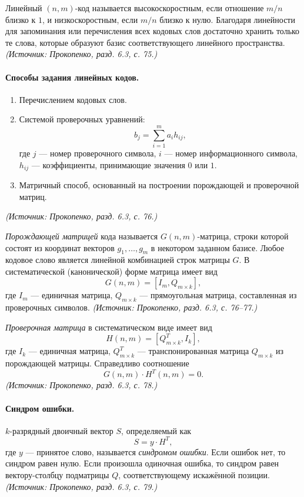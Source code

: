\documentclass[a4paper,12pt]{article}
\begin{document}
Линейный \((n,m)\)-код называется высокоскоростным, если отношение \(m/n\) близко к \(1\), и низкоскоростным, если \(m/n\) близко к нулю. Благодаря линейности для запоминания или перечисления всех кодовых слов достаточно хранить только те слова, которые образуют базис соответствующего линейного пространства.
\textit{(Источник: Прокопенко, разд. 6.3, с. 75.)}

\paragraph{Способы задания линейных кодов.}
\begin{enumerate}[label=\arabic*)]
\item Перечислением кодовых слов.
\item Системой проверочных уравнений:
\[
b_j=\sum_{i=1}^m a_ih_{ij},
\]
где \(j\) — номер проверочного символа, \(i\) — номер информационного символа, \(h_{ij}\) — коэффициенты, принимающие значения \(0\) или \(1\).
\item Матричный способ, основанный на построении порождающей и проверочной матриц.
\end{enumerate}
\textit{(Источник: Прокопенко, разд. 6.3, с. 76.)}

\emph{Порождающей матрицей} кода называется \(G(n,m)\)-матрица, строки которой состоят из координат векторов \(g_1,\dots,g_m\) в некотором заданном базисе. Любое кодовое слово является линейной комбинацией строк матрицы \(G\). В систематической (канонической) форме матрица имеет вид
\[
G(n,m)=[I_m,Q_{m\times k}],
\]
где \(I_m\) — единичная матрица, \(Q_{m\times k}\) — прямоугольная матрица, составленная из проверочных символов.
\textit{(Источник: Прокопенко, разд. 6.3, с. 76--77.)}

\emph{Проверочная матрица} в систематическом виде имеет вид
\[
H(n,m)=[Q_{m\times k}^T,I_k],
\]
где \(I_k\) — единичная матрица, \(Q_{m\times k}^T\) — транспонированная матрица \(Q_{m\times k}\) из порождающей матрицы. Справедливо соотношение
\[
G(n,m)\cdot H^T(n,m)=0.
\]
\textit{(Источник: Прокопенко, разд. 6.3, с. 78.)}

\paragraph{Синдром ошибки.}
\(k\)-разрядный двоичный вектор \(S\), определяемый как
\[
S=y\cdot H^T,
\]
где \(y\) — принятое слово, называется \emph{синдромом ошибки}. Если ошибок нет, то синдром равен нулю. Если произошла одиночная ошибка, то синдром равен вектору-столбцу подматрицы \(Q\), соответствующему искажённой позиции.
\textit{(Источник: Прокопенко, разд. 6.3, с. 79.)}
\end{document}
